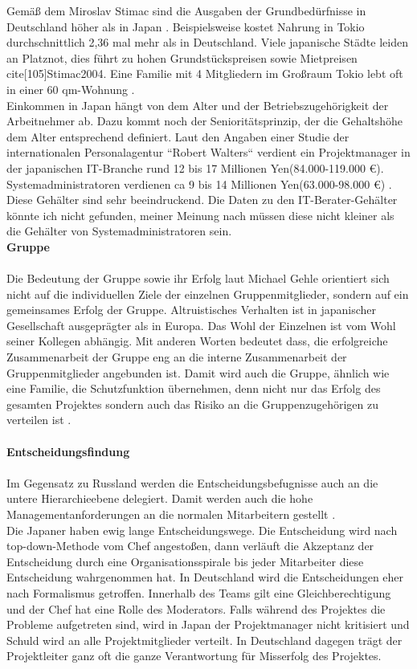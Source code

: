 		Gemäß dem Miroslav Stimac sind die Ausgaben der Grundbedürfnisse in Deutschland höher als in Japan \cite[101]{Stimac2004}.
		Beispielsweise kostet Nahrung in Tokio durchschnittlich 2,36 mal mehr als in Deutschland. Viele japanische Städte leiden an Platznot, dies führt zu hohen Grundstückspreisen sowie Mietpreisen \\cite[105]{Stimac2004}.
		Eine Familie mit 4 Mitgliedern im Großraum Tokio lebt oft in einer 60 qm-Wohnung \cite{ArbZeitJP}.\\	
		Einkommen in Japan hängt von dem  Alter und der Betriebszugehörigkeit
		der Arbeitnehmer ab. Dazu kommt noch der Senioritätsprinzip, der die Gehaltshöhe dem Alter entsprechend definiert. Laut den Angaben  einer Studie der internationalen Personalagentur ``Robert Walters`` verdient ein Projektmanager in der japanischen IT-Branche rund 12 bis 17 Millionen Yen(84.000-119.000 €).
		Systemadministratoren verdienen ca 9 bis 14 Millionen Yen(63.000-98.000 €) \cite{EinkommenJP}.
		Diese Gehälter sind sehr beeindruckend. Die Daten zu den IT-Berater-Gehälter könnte ich nicht gefunden, meiner Meinung nach müssen diese nicht kleiner als die Gehälter von Systemadministratoren sein. \\
			\textbf{Gruppe}\\
			\\
		Die Bedeutung der Gruppe sowie ihr Erfolg laut Michael Gehle orientiert sich nicht auf die individuellen Ziele der	einzelnen Gruppenmitglieder, sondern auf ein gemeinsames Erfolg der Gruppe. Altruistisches Verhalten ist in japanischer Gesellschaft ausgeprägter als in Europa. Das Wohl der Einzelnen ist vom Wohl seiner Kollegen abhängig. Mit anderen Worten bedeutet dass, die erfolgreiche Zusammenarbeit der Gruppe eng an die interne Zusammenarbeit der Gruppenmitglieder angebunden  ist. Damit wird auch die Gruppe,  ähnlich wie eine Familie, die Schutzfunktion übernehmen, denn nicht nur das Erfolg des gesamten Projektes sondern auch das Risiko an die Gruppenzugehörigen zu verteilen ist \cite[233]{3LaenderVergl}.\\ \\
		\textbf{Entscheidungsfindung} \\ \\
		Im Gegensatz zu Russland werden die Entscheidungsbefugnisse auch an die untere Hierarchieebene delegiert. Damit werden auch die hohe Managementanforderungen  an die normalen Mitarbeitern gestellt \cite[233]{3LaenderVergl}.\\
		Die Japaner haben ewig lange Entscheidungswege. Die Entscheidung wird nach top-down-Methode vom Chef angestoßen, dann verläuft die Akzeptanz der Entscheidung durch eine Organisationsspirale bis jeder Mitarbeiter diese Entscheidung wahrgenommen hat. In Deutschland wird die Entscheidungen eher nach Formalismus getroffen. Innerhalb des Teams gilt eine Gleichberechtigung und der Chef hat eine Rolle des Moderators. Falls während des Projektes die Probleme aufgetreten sind, wird in Japan der Projektmanager nicht kritisiert und Schuld wird an alle Projektmitglieder verteilt. In Deutschland dagegen trägt der Projektleiter ganz oft die ganze Verantwortung für Misserfolg des Projektes.
